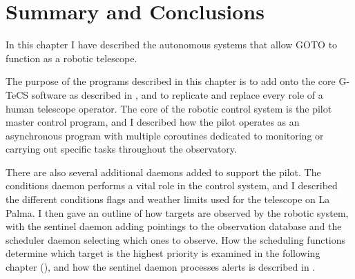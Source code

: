 
\section{Summary and Conclusions}
\label{sec:autonomous_conclusion}


\begin{colsection}

In this chapter I have described the autonomous systems that allow GOTO to function as a robotic telescope.

The purpose of the programs described in this chapter is to add onto the core G-TeCS software as described in , and to replicate and replace every role of a human telescope operator. The core of the robotic control system is the pilot master control program, and I described how the pilot operates as an asynchronous program with multiple coroutines dedicated to monitoring or carrying out specific tasks throughout the observatory.

There are also several additional daemons added to support the pilot. The conditions daemon performs a vital role in the control system, and I described the different conditions flags and weather limits used for the telescope on La Palma. I then gave an outline of how targets are observed by the robotic system, with the sentinel daemon adding pointings to the observation database and the scheduler daemon selecting which ones to observe. How the scheduling functions determine which target is the highest priority is examined in the following chapter (), and how the sentinel daemon processes alerts is described in .

\end{colsection}

